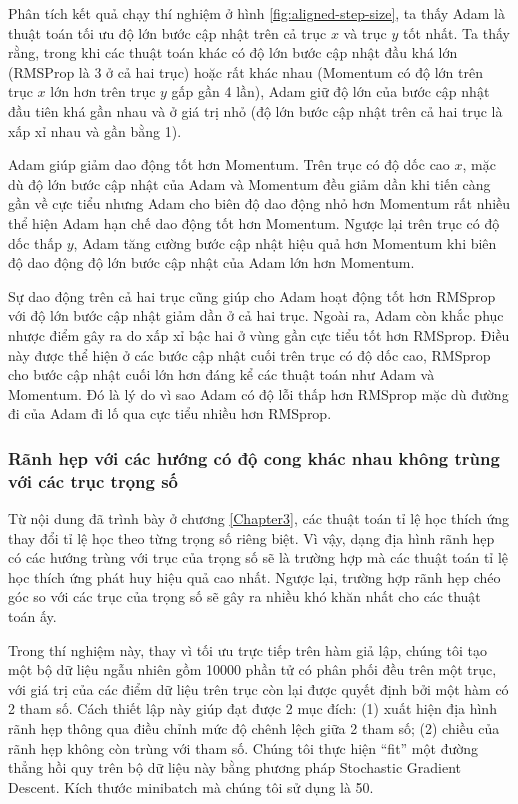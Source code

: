 Phân tích kết quả chạy thí nghiệm ở hình \ref{fig:aligned-step-size}, ta thấy Adam là thuật toán tối ưu độ lớn bước cập nhật trên cả trục $x$ và trục $y$ tốt nhất. Ta thấy rằng, trong khi các thuật toán khác có độ lớn bước cập nhật đầu khá lớn (RMSProp là 3 ở cả hai trục) hoặc rất khác nhau (Momentum có độ lớn trên trục $x$ lớn hơn trên trục $y$ gấp gần 4 lần), Adam giữ độ lớn của bước cập nhật đầu tiên khá gần nhau và ở giá trị nhỏ (độ lớn bước cập nhật trên cả hai trục là xấp xỉ nhau và gần bằng 1).

Adam giúp giảm dao động tốt hơn Momentum. Trên trục có độ dốc cao $x$, mặc dù độ lớn bước cập nhật của Adam và Momentum đều giảm dần khi tiến càng gần về cực tiểu nhưng Adam cho biên độ dao động nhỏ hơn Momentum rất nhiều thể hiện Adam hạn chế dao động tốt hơn Momentum. Ngược lại trên trục có độ dốc thấp $y$, Adam tăng cường bước cập nhật hiệu quả hơn Momentum khi biên độ dao động độ lớn bước cập nhật của Adam lớn hơn Momentum.

Sự dao động trên cả hai trục cũng giúp cho Adam hoạt động tốt hơn RMSprop với độ lớn bước cập nhật giảm dần ở cả hai trục. Ngoài ra, Adam còn khắc phục nhược điểm gây ra do xấp xỉ bậc hai ở vùng gần cực tiểu tốt hơn RMSprop. Điều này được thể hiện ở các bước cập nhật cuối trên trục có độ dốc cao, RMSprop cho bước cập nhật cuối lớn hơn đáng kể các thuật toán như Adam và Momentum. Đó là lý do vì sao Adam có độ lỗi thấp hơn RMSprop mặc dù đường đi của Adam đi lố qua cực tiểu nhiều hơn RMSprop.

\subsubsection{Rãnh hẹp với các hướng có độ cong khác nhau không trùng với các trục trọng số}
\label{exp:aligned-nonaligned}

Từ nội dung đã trình bày ở chương \ref{Chapter3}, các thuật toán tỉ lệ học thích ứng thay đổi tỉ lệ học theo từng trọng số riêng biệt. Vì vậy, dạng địa hình rãnh hẹp có các hướng trùng với trục của trọng số sẽ là trường hợp mà các thuật toán tỉ lệ học thích ứng phát huy hiệu quả cao nhất. Ngược lại, trường hợp rãnh hẹp chéo góc so với các trục của trọng số sẽ gây ra nhiều khó khăn nhất cho các thuật toán ấy.

Trong thí nghiệm này, thay vì tối ưu trực tiếp trên hàm giả lập, chúng tôi tạo một bộ dữ liệu ngẫu nhiên gồm 10000 phần tử có phân phối đều trên một trục, với giá trị của các điểm dữ liệu trên trục còn lại được quyết định bởi một hàm có 2 tham số. Cách thiết lập này giúp đạt được 2 mục đích: (1) xuất hiện địa hình rãnh hẹp thông qua điều chỉnh mức độ chênh lệch giữa 2 tham số; (2) chiều của rãnh hẹp không còn trùng với tham số. Chúng tôi thực hiện ``fit'' một đường thẳng hồi quy trên bộ dữ liệu này bằng phương pháp Stochastic Gradient Descent. Kích thước minibatch mà chúng tôi sử dụng là 50.

